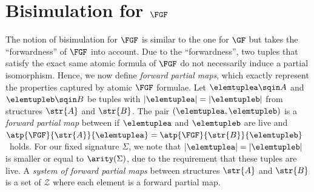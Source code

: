 \section{Bisimulation for $\FGF$}
The notion of bisimulation for $\FGF$ is similar to the one for $\GF$ but takes the ``forwardness'' of $\FGF$ into account.
Due to the ``forwardness'', two tuples that satisfy the exact same atomic formula of $\FGF$ do not necessarily induce a partial isomorphism.
Hence, we now define \emph{forward partial maps}, which exactly represent the properties captured by atomic $\FGF$ formulae.
Let $\elemtuplea \sqin A$ and $\elemtupleb \sqin B$ be tuples with $|\elemtuplea| = |\elemtupleb|$ from structures $\str{A}$ and $\str{B}$.
The pair $(\elemtuplea, \elemtupleb)$ is a \emph{forward partial map} between if $\elemtuplea$ and $\elemtupleb$ are live and $\atp{\FGF}{\str{A}}{\elemtuplea} = \atp{\FGF}{\str{B}}{\elemtupleb}$~holds.
For our fixed signature $\Sigma$, we note that $|\elemtuplea| = |\elemtupleb|$ is smaller or equal to $\arity(\Sigma)$, due to the requirement that these tuples are live.
A \emph{system of forward partial maps} between structures $\str{A}$ and $\str{B}$ is a set of $\mathcal{Z}$ where each element is a forward partial map.

